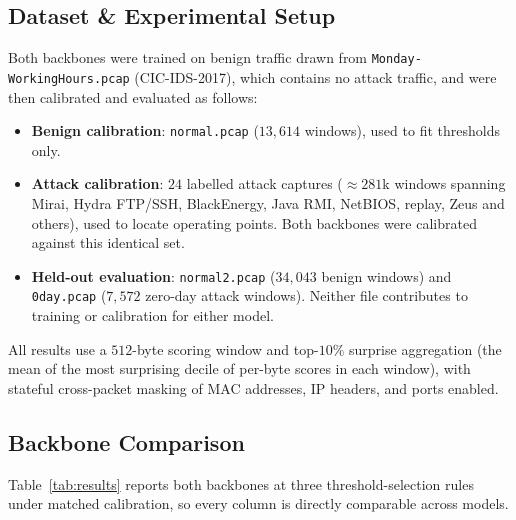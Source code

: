 \documentclass[10pt,journal,compsoc]{IEEEtran}
\begin{document}
\subsection{Dataset \& Experimental Setup}
Both backbones were trained on benign traffic drawn from \texttt{Monday-WorkingHours.pcap} (CIC-IDS-2017), which contains no attack traffic, and were then calibrated and evaluated as follows:
\begin{itemize}
    \item \textbf{Benign calibration}: \texttt{normal.pcap} ($13{,}614$ windows), used to fit thresholds only.
    \item \textbf{Attack calibration}: $24$ labelled attack captures ($\approx 281$k windows spanning Mirai, Hydra FTP/SSH, BlackEnergy, Java RMI, NetBIOS, replay, Zeus and others), used to locate operating points. Both backbones were calibrated against this identical set.
    \item \textbf{Held-out evaluation}: \texttt{normal2.pcap} ($34{,}043$ benign windows) and \texttt{0day.pcap} ($7{,}572$ zero-day attack windows). Neither file contributes to training or calibration for either model.
\end{itemize}

All results use a $512$-byte scoring window and top-$10\%$ surprise aggregation (the mean of the most surprising decile of per-byte scores in each window), with stateful cross-packet masking of MAC addresses, IP headers, and ports enabled.

\subsection{Backbone Comparison}

Table~\ref{tab:results} reports both backbones at three threshold-selection rules under matched calibration, so every column is directly comparable across models.
\end{document}
